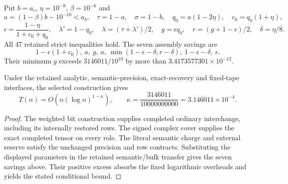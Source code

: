 Put $b=a_c$, $\eta=10^{-8}$, $\beta=10^{-6}$ and
\[
 a=(1-\beta)b-10^{-10}<a_b,\quad \tau=1-a,\quad\sigma=1-b,
 \quad q_0=a(1-2\eta),\quad c_0=q_0(1+\eta),
\]
\[
 \epsilon=\frac{1-\eta}{1+c_0+q_0},\quad
 \lambda'=1-q_0,\quad\lambda=(\tau+\lambda')/2,
 \quad g=\epsilon q_0,\quad r=(g+1-\epsilon)/2,\quad\delta=\eta/8.
\]
All 47 retained strict inequalities hold. The seven assembly savings are
\[
 1-\epsilon(1+c_0),\ a,\ g,\ a,\
 \min(1-\epsilon-\delta,r-\delta),\ 1-\epsilon-\delta,\ \epsilon.
\]
Their minimum $g$ exceeds $3146011/10^{10}$ by more than
$3.4173577301\times10^{-12}$.
\begin{theorem}
Under the retained analytic, semantic-precision, exact-recovery and
fixed-tape interfaces, the selected construction gives
\[
 T(n)=O\!\left(n(\log n)^{1-\kappa}\right),\qquad
 \boxed{\kappa=\frac{3146011}{10000000000}=3.146011\times10^{-4}}.
\]
\end{theorem}
\begin{proof}
The weighted bit construction supplies completed ordinary interchange,
including its internally restored rows. The signed complex cover supplies
the exact completed tensor on every role. The literal semantic charge and
external reserve satisfy the unchanged precision and row contracts.
Substituting the displayed parameters in the retained semantic/bulk
transfer gives the seven savings above. Their positive excess absorbs
the fixed logarithmic overheads and yields the stated conditional bound.
\end{proof}
